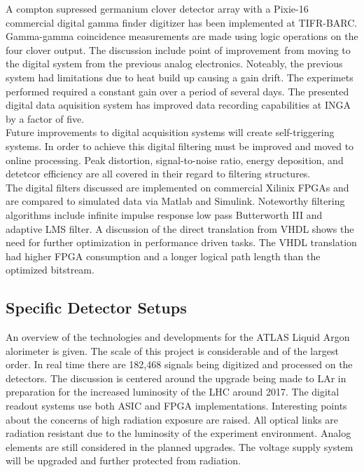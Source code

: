 \documentclass[12pt]{article}
\begin{document}
{\large\textbf{\cite{Palit201290}}}
A compton supressed germanium clover detector array with a Pixie-16 commercial digital gamma finder digitizer has been implemented at TIFR-BARC. Gamma-gamma coincidence measurements are made using logic operations on the four clover output. The discussion include point of improvement from moving to the digital system from the previous analog electronics. Noteably, the previous system had limitations due to heat build up causing a gain drift. The experimets performed required a constant gain over a period of several days. The presented digital data aquisition system has improved data recording capabilities at INGA by a factor of five.
\\[20pt]


{\large\textbf{\cite{Alberto200999}}}
Future improvements to digital acquisition systems will create self-triggering systems. In order to achieve this digital filtering must be improved and moved to online processing. Peak distortion, signal-to-noise ratio, energy deposition, and detetcor efficiency are all covered in their regard to filtering structures.
\\
The digital filters discussed are implemented on commercial Xilinix FPGAs and are compared to simulated data via Matlab and Simulink. Noteworthy filtering algorithms include infinite impulse response low pass Butterworth III and adaptive LMS filter. A discussion of the direct translation from VHDL shows the need for further optimization in performance driven tasks. The VHDL translation had higher FPGA consumption and a longer logical path length than the optimized bitstream.
\\[20pt]


\subsection{Specific Detector Setups}

{\large\textbf{\cite{Chen2010261}}}
An overview of the technologies and developments for the ATLAS Liquid Argon alorimeter is given. The scale of this project is considerable and of the largest order. In real time there are 182,468 signals being digitized and processed on the detectors. The discussion is centered around the upgrade being made to LAr in preparation for the increased luminosity of the LHC around 2017. The digital readout systems use both ASIC and FPGA implementations.
Interesting points about the concerns of high radiation exposure are raised. All optical links are radiation resistant due to the luminosity of the experiment environment. Analog elements are still considered in the planned upgrades. The voltage supply system will be upgraded and further protected from radiation.
 \\[20pt]
\end{document}
